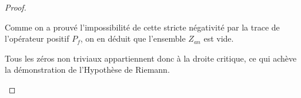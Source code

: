 \documentclass[Riemann_Hypothesis.tex]{subfiles}
\begin{document}
\begin{proof}
\begin{part_proof}
        Comme on a prouvé l'impossibilité de cette stricte négativité par la trace de l'opérateur positif $P_f$, on en déduit que l'ensemble $Z_{an}$ est vide. \par
        Tous les zéros non triviaux appartiennent donc à la droite critique, ce qui achève la démonstration de l'Hypothèse de Riemann.
    \end{part_proof}

\end{proof}
\end{document}
